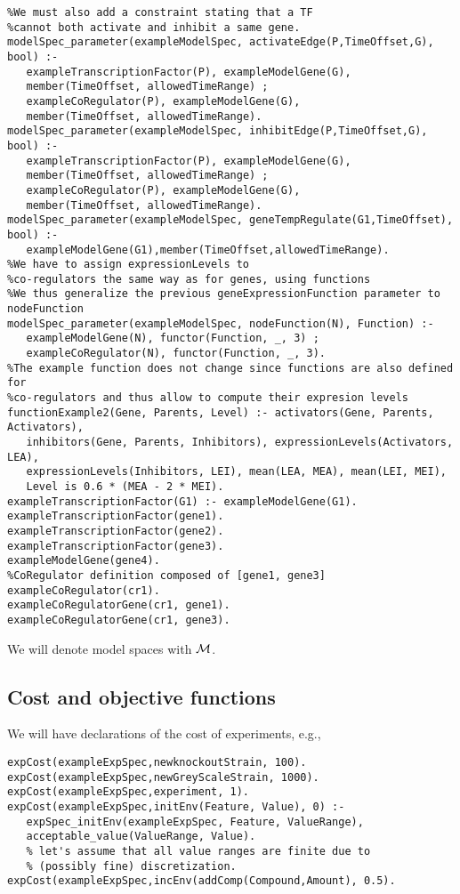 \documentclass{article}
\begin{document}
\begin{verbatim} 
%We must also add a constraint stating that a TF 
%cannot both activate and inhibit a same gene.
modelSpec_parameter(exampleModelSpec, activateEdge(P,TimeOffset,G), bool) :-
   exampleTranscriptionFactor(P), exampleModelGene(G), 
   member(TimeOffset, allowedTimeRange) ;
   exampleCoRegulator(P), exampleModelGene(G),
   member(TimeOffset, allowedTimeRange).
modelSpec_parameter(exampleModelSpec, inhibitEdge(P,TimeOffset,G), bool) :-
   exampleTranscriptionFactor(P), exampleModelGene(G),
   member(TimeOffset, allowedTimeRange) ;
   exampleCoRegulator(P), exampleModelGene(G),
   member(TimeOffset, allowedTimeRange).
modelSpec_parameter(exampleModelSpec, geneTempRegulate(G1,TimeOffset), bool) :-
   exampleModelGene(G1),member(TimeOffset,allowedTimeRange).
%We have to assign expressionLevels to
%co-regulators the same way as for genes, using functions
%We thus generalize the previous geneExpressionFunction parameter to nodeFunction
modelSpec_parameter(exampleModelSpec, nodeFunction(N), Function) :- 
   exampleModelGene(N), functor(Function, _, 3) ;
   exampleCoRegulator(N), functor(Function, _, 3).
%The example function does not change since functions are also defined for
%co-regulators and thus allow to compute their expresion levels
functionExample2(Gene, Parents, Level) :- activators(Gene, Parents, Activators),
   inhibitors(Gene, Parents, Inhibitors), expressionLevels(Activators, LEA), 
   expressionLevels(Inhibitors, LEI), mean(LEA, MEA), mean(LEI, MEI),
   Level is 0.6 * (MEA - 2 * MEI).
exampleTranscriptionFactor(G1) :- exampleModelGene(G1).
exampleTranscriptionFactor(gene1).
exampleTranscriptionFactor(gene2).
exampleTranscriptionFactor(gene3).
exampleModelGene(gene4).
%CoRegulator definition composed of [gene1, gene3]
exampleCoRegulator(cr1).
exampleCoRegulatorGene(cr1, gene1).
exampleCoRegulatorGene(cr1, gene3).
\end{verbatim}

We will denote model spaces with $\mathcal{M}$.

\subsection{Cost and objective functions}

We will have declarations of the cost of experiments, e.g.,

\begin{verbatim}
expCost(exampleExpSpec,newknockoutStrain, 100).
expCost(exampleExpSpec,newGreyScaleStrain, 1000).
expCost(exampleExpSpec,experiment, 1).
expCost(exampleExpSpec,initEnv(Feature, Value), 0) :-
   expSpec_initEnv(exampleExpSpec, Feature, ValueRange),
   acceptable_value(ValueRange, Value). 
   % let's assume that all value ranges are finite due to 
   % (possibly fine) discretization.
expCost(exampleExpSpec,incEnv(addComp(Compound,Amount), 0.5).
\end{verbatim}
\end{document}
